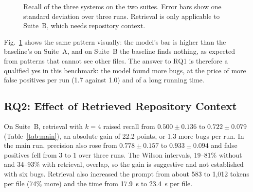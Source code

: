 \documentclass[12pt,onecolumn,draftclsnofoot]{IEEEtran}
\begin{document}
\begin{figure}[!t]
\centering
{}
\caption{Recall of the three systems on the two suites. Error bars show one standard deviation over three runs. Retrieval is only applicable to Suite~B, which needs repository context.}\label{fig:bars}
\end{figure}

Fig.~\ref{fig:bars} shows the same pattern visually: the model's bar is higher than the baseline's on Suite~A, and on Suite~B the baseline finds nothing, as expected from patterns that cannot see other files. The answer to RQ1 is therefore a qualified yes in this benchmark: the model found more bugs, at the price of more false positives per run (1.7 against 1.0) and of a long running time.

\subsection{RQ2: Effect of Retrieved Repository Context}
On Suite~B, retrieval with $k=4$ raised recall from $0.500\pm0.136$ to $0.722\pm0.079$ (Table~\ref{tab:main}), an absolute gain of 22.2 points, or 1.3 more bugs per run. In the main run, precision also rose from $0.778\pm0.157$ to $0.933\pm0.094$ and false positives fell from 3 to 1 over three runs. The Wilson intervals, 19--81\% without and 34--93\% with retrieval, overlap, so the gain is suggestive and not established with six bugs. Retrieval also increased the prompt from about 583 to 1,012 tokens per file (74\% more) and the time from 17.9~s to 23.4~s per file.
\end{document}

